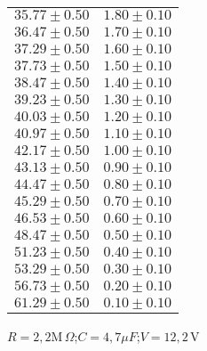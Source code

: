 \documentclass[12pt, letterpaper]{article} %
\theoremstyle{plain} %
\begin{document}
\begin{figure}[H]
\begin{minipage}[t]{0.48\textwidth}
\begin{minipage}[t]{\linewidth}
\begin{tabular}{|c|c|}
$35.77 \pm 0.50$ & $1.80 \pm 0.10$ \\
$36.47 \pm 0.50$ & $1.70 \pm 0.10$ \\
$37.29 \pm 0.50$ & $1.60 \pm 0.10$ \\
$37.73 \pm 0.50$ & $1.50 \pm 0.10$ \\
$38.47 \pm 0.50$ & $1.40 \pm 0.10$ \\
$39.23 \pm 0.50$ & $1.30 \pm 0.10$ \\
$40.03 \pm 0.50$ & $1.20 \pm 0.10$ \\
$40.97 \pm 0.50$ & $1.10 \pm 0.10$ \\
$42.17 \pm 0.50$ & $1.00 \pm 0.10$ \\
$43.13 \pm 0.50$ & $0.90 \pm 0.10$ \\
$44.47 \pm 0.50$ & $0.80 \pm 0.10$ \\
$45.29 \pm 0.50$ & $0.70 \pm 0.10$ \\
$46.53 \pm 0.50$ & $0.60 \pm 0.10$ \\
$48.47 \pm 0.50$ & $0.50 \pm 0.10$ \\
$51.23 \pm 0.50$ & $0.40 \pm 0.10$ \\
$53.29 \pm 0.50$ & $0.30 \pm 0.10$ \\
$56.73 \pm 0.50$ & $0.20 \pm 0.10$ \\
$61.29 \pm 0.50$ & $0.10 \pm 0.10$ \\
\hline
\end{tabular}
\caption*{$R = 2,2\text{M}\,\Omega$;$C = 4,7\mu F$;$V = 12,2 $\,V}
\end{minipage}


\end{minipage}
\end{figure}
\end{document}
